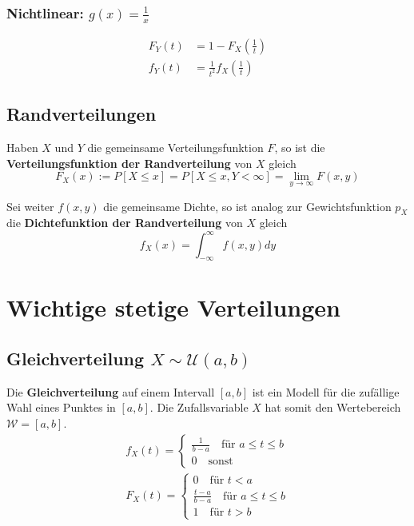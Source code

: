 \documentclass[11pt]{article}
\begin{document}
\subsubsection{Nichtlinear: $g(x) = \frac{1}{x}$}

\begin{equation*}
\begin{split}
	F_Y(t) & = 1 - F_X(\frac{1}{t}) \\
	f_Y(t) & = \frac{1}{t^2}f_X(\frac{1}{t})
\end{split}
\end{equation*}

\subsection{Randverteilungen}

Haben $X$ und $Y$ die gemeinsame Verteilungsfunktion $F$, so ist die \textbf{Verteilungsfunktion der Randverteilung} von $X$ gleich
\begin{equation*}
	F_X(x) := P[X \leq x] = P[X \leq x, Y < \infty] = \lim_{y \rightarrow\infty}F(x,y)
\end{equation*}

Sei weiter $f(x,y)$ die gemeinsame Dichte, so ist analog zur Gewichtsfunktion $p_X$  die \textbf{Dichtefunktion der Randverteilung} von $X$ gleich
\begin{equation*}
	f_X(x) = \int_{-\infty}^\infty f(x,y) dy
\end{equation*}

\section{Wichtige stetige Verteilungen}

\subsection{Gleichverteilung $X \sim \mathcal{U}(a,b)$}

Die \textbf{Gleichverteilung} auf einem Intervall $[a,b]$ ist ein Modell f{\"u}r die zuf{\"a}llige Wahl eines Punktes in $[a,b]$. Die Zufallsvariable $X$ hat somit den Wertebereich $\mathcal{W} = [a,b]$.
\begin{equation*}
\begin{split}
	f_X(t) = \begin{cases}
		\frac{1}{b-a}\quad\text{f{\"u}r }a\leq t \leq b \\
		0\quad\text{sonst }
	\end{cases} \\
	F_X(t) = \begin{cases}
		0\quad\text{f{\"u}r } t < a \\
		\frac{t-a}{b-a}\quad\text{f{\"u}r } a \leq t \leq b \\
		1\quad\text{f{\"u}r } t > b
	\end{cases}
\end{split}
\end{equation*}
\end{document}
